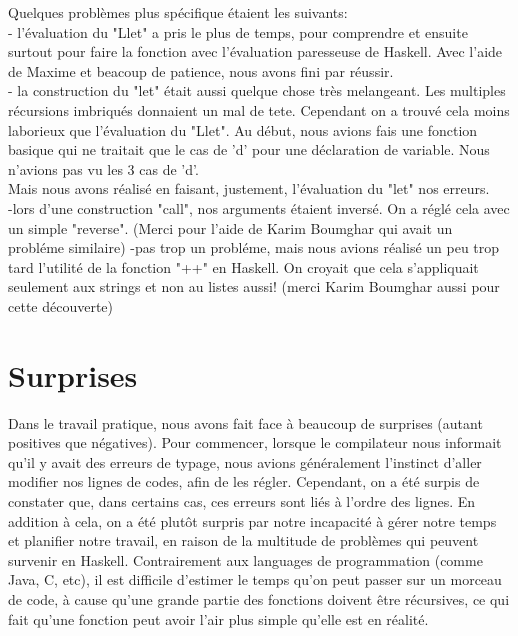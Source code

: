 \documentclass[11pt]{article}
\begin{document}
\par Quelques problèmes plus spécifique étaient les suivants: \\
- l'évaluation du "Llet" a pris le plus de temps, pour comprendre et ensuite surtout pour faire la fonction avec l'évaluation paresseuse de Haskell. Avec l'aide de Maxime et beacoup de patience, nous avons fini par réussir.\\
- la construction du "let" était aussi quelque chose très melangeant. Les multiples récursions imbriqués donnaient un mal de tete. Cependant on a trouvé cela moins laborieux que l'évaluation du "Llet". Au début, nous avions fais une fonction basique qui ne traitait que le cas de 'd' pour une déclaration de variable. Nous n'avions pas vu les 3 cas de 'd'.\\
Mais nous avons réalisé en faisant, justement, l'évaluation du "let" nos erreurs. \\
-lors d'une construction "call", nos arguments étaient inversé. On a réglé cela avec un simple "reverse". (Merci pour l'aide de Karim Boumghar qui avait un probléme similaire)
-pas trop un probléme, mais nous avions réalisé un peu trop tard l'utilité de la fonction "++" en Haskell. On croyait que cela s'appliquait seulement aux strings et non au listes aussi! (merci Karim Boumghar aussi pour cette découverte)

\section{Surprises}

\par Dans le travail pratique, nous avons fait face à beaucoup de surprises (autant positives que négatives). Pour commencer, lorsque le compilateur nous informait qu'il y avait des erreurs de typage, nous avions généralement l'instinct d'aller modifier nos lignes de codes, afin de les régler. Cependant, on a été surpis de constater que, dans certains cas, ces erreurs sont liés à l'ordre des lignes. En addition à cela, on a été plutôt surpris par notre incapacité à gérer notre temps et planifier notre travail, en raison de la multitude de problèmes qui peuvent survenir en Haskell. Contrairement aux languages de programmation (comme Java, C, etc), il est difficile d'estimer le temps qu'on peut passer sur un morceau de code, à cause qu'une grande partie des fonctions doivent être récursives, ce qui fait qu'une fonction peut avoir l'air plus simple qu'elle est en réalité.
\end{document}

